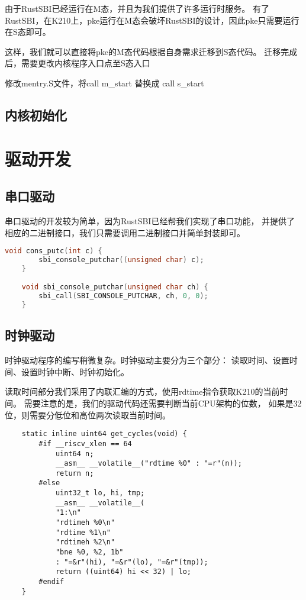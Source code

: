 由于RustSBI已经运行在M态，并且为我们提供了许多运行时服务。
有了RustSBI，在K210上，pke运行在M态会破坏RustSBI的设计，因此pke只需要运行在S态即可。

这样，我们就可以直接将pke的M态代码根据自身需求迁移到S态代码。
迁移完成后，需要更改内核程序入口点至S态入口

修改mentry.S文件，将call m\_start 替换成 call s\_start

\subsection{内核初始化}

\section{驱动开发}

\subsection{串口驱动}

串口驱动的开发较为简单，因为RustSBI已经帮我们实现了串口功能，
并提供了相应的二进制接口，我们只需要调用二进制接口并简单封装即可。

\begin{lstlisting}[caption={串口驱动}, label={lst:uart_driver}, language=C]
    void cons_putc(int c) {
        sbi_console_putchar((unsigned char) c);
    }    

    void sbi_console_putchar(unsigned char ch) {
        sbi_call(SBI_CONSOLE_PUTCHAR, ch, 0, 0);
    }    
\end{lstlisting}

\subsection{时钟驱动}

时钟驱动程序的编写稍微复杂。时钟驱动主要分为三个部分：
读取时间、设置时间、设置时钟中断、时钟初始化。

读取时间部分我们采用了内联汇编的方式，使用rdtime指令获取K210的当前时间。
需要注意的是，我们的驱动代码还需要判断当前CPU架构的位数，
如果是32位，则需要分低位和高位两次读取当前时间。

\begin{lstlisting}
    static inline uint64 get_cycles(void) {
        #if __riscv_xlen == 64
            uint64 n;
            __asm__ __volatile__("rdtime %0" : "=r"(n));
            return n;
        #else
            uint32_t lo, hi, tmp;
            __asm__ __volatile__(
            "1:\n"
            "rdtimeh %0\n"
            "rdtime %1\n"
            "rdtimeh %2\n"
            "bne %0, %2, 1b"
            : "=&r"(hi), "=&r"(lo), "=&r"(tmp));
            return ((uint64) hi << 32) | lo;
        #endif
    }    
\end{lstlisting}

